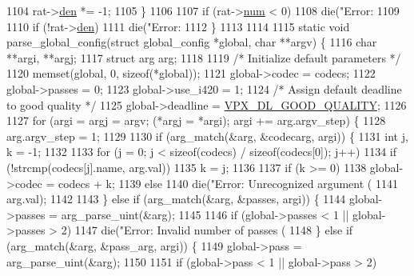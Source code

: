 \begin{DoxyCodeInclude}
{{{{{{{{{{{{{{{{{{{{{{{{{{{1104     rat->\hyperlink{structvpx__rational_a29dd2ab4001377b3aa21885ef969759f}{den} *= -1;
1105   \}
1106 
1107   \textcolor{keywordflow}{if} (rat->\hyperlink{structvpx__rational_ae7774f21a22c9bef3aa73156c79f4731}{num} < 0)
1108     die(\textcolor{stringliteral}{"Error: %
1109 
1110   \textcolor{keywordflow}{if} (!rat->\hyperlink{structvpx__rational_a29dd2ab4001377b3aa21885ef969759f}{den})
1111     die(\textcolor{stringliteral}{"Error: %
1112 \}
1113 
1114 
1115 \textcolor{keyword}{static} \textcolor{keywordtype}{void} parse\_global\_config(\textcolor{keyword}{struct} global\_config *global, \textcolor{keywordtype}{char} **argv) \{
1116   \textcolor{keywordtype}{char}       **argi, **argj;
1117   \textcolor{keyword}{struct }arg   arg;
1118 
1119   \textcolor{comment}{/* Initialize default parameters */}
1120   memset(global, 0, \textcolor{keyword}{sizeof}(*global));
1121   global->codec = codecs;
1122   global->passes = 0;
1123   global->use\_i420 = 1;
1124   \textcolor{comment}{/* Assign default deadline to good quality */}
1125   global->deadline = \hyperlink{group__encoder_ga5d00a9f9e10b9f49ca91e72c1f01c9fd}{VPX\_DL\_GOOD\_QUALITY};
1126 
1127   \textcolor{keywordflow}{for} (argi = argj = argv; (*argj = *argi); argi += arg.argv\_step) \{
1128     arg.argv\_step = 1;
1129 
1130     \textcolor{keywordflow}{if} (arg\_match(&arg, &codecarg, argi)) \{
1131       \textcolor{keywordtype}{int} j, k = -1;
1132 
1133       \textcolor{keywordflow}{for} (j = 0; j < \textcolor{keyword}{sizeof}(codecs) / \textcolor{keyword}{sizeof}(codecs[0]); j++)
1134         \textcolor{keywordflow}{if} (!strcmp(codecs[j].name, arg.val))
1135           k = j;
1136 
1137       \textcolor{keywordflow}{if} (k >= 0)
1138         global->codec = codecs + k;
1139       \textcolor{keywordflow}{else}
1140         die(\textcolor{stringliteral}{"Error: Unrecognized argument (%
1141             arg.val);
1142 
1143     \} \textcolor{keywordflow}{else} \textcolor{keywordflow}{if} (arg\_match(&arg, &passes, argi)) \{
1144       global->passes = arg\_parse\_uint(&arg);
1145 
1146       \textcolor{keywordflow}{if} (global->passes < 1 || global->passes > 2)
1147         die(\textcolor{stringliteral}{"Error: Invalid number of passes (%
1148     \} \textcolor{keywordflow}{else} \textcolor{keywordflow}{if} (arg\_match(&arg, &pass\_arg, argi)) \{
1149       global->pass = arg\_parse\_uint(&arg);
1150 
1151       \textcolor{keywordflow}{if} (global->pass < 1 || global->pass > 2)
}}}}}}}}}}}}}}}}}}}}}}}}}}}}}}}
\end{DoxyCodeInclude}
